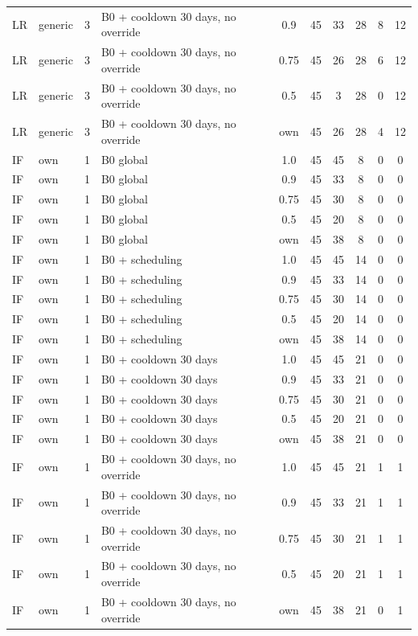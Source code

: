 \documentclass[10pt,onecolumn,letterpaper]{article}
\begin{document}
\begin{longtable}{lllp{4.4cm}cccccc}
LR & generic & 3 & B0 + cooldown 30 days, no override & 0.9 & 45 & 33 & 28 & 8 & 12 \\
LR & generic & 3 & B0 + cooldown 30 days, no override & 0.75 & 45 & 26 & 28 & 6 & 12 \\
LR & generic & 3 & B0 + cooldown 30 days, no override & 0.5 & 45 & 3 & 28 & 0 & 12 \\
LR & generic & 3 & B0 + cooldown 30 days, no override & own & 45 & 26 & 28 & 4 & 12 \\
IF & own & 1 & B0 global & 1.0 & 45 & 45 & 8 & 0 & 0 \\
IF & own & 1 & B0 global & 0.9 & 45 & 33 & 8 & 0 & 0 \\
IF & own & 1 & B0 global & 0.75 & 45 & 30 & 8 & 0 & 0 \\
IF & own & 1 & B0 global & 0.5 & 45 & 20 & 8 & 0 & 0 \\
IF & own & 1 & B0 global & own & 45 & 38 & 8 & 0 & 0 \\
IF & own & 1 & B0 + scheduling & 1.0 & 45 & 45 & 14 & 0 & 0 \\
IF & own & 1 & B0 + scheduling & 0.9 & 45 & 33 & 14 & 0 & 0 \\
IF & own & 1 & B0 + scheduling & 0.75 & 45 & 30 & 14 & 0 & 0 \\
IF & own & 1 & B0 + scheduling & 0.5 & 45 & 20 & 14 & 0 & 0 \\
IF & own & 1 & B0 + scheduling & own & 45 & 38 & 14 & 0 & 0 \\
IF & own & 1 & B0 + cooldown 30 days & 1.0 & 45 & 45 & 21 & 0 & 0 \\
IF & own & 1 & B0 + cooldown 30 days & 0.9 & 45 & 33 & 21 & 0 & 0 \\
IF & own & 1 & B0 + cooldown 30 days & 0.75 & 45 & 30 & 21 & 0 & 0 \\
IF & own & 1 & B0 + cooldown 30 days & 0.5 & 45 & 20 & 21 & 0 & 0 \\
IF & own & 1 & B0 + cooldown 30 days & own & 45 & 38 & 21 & 0 & 0 \\
IF & own & 1 & B0 + cooldown 30 days, no override & 1.0 & 45 & 45 & 21 & 1 & 1 \\
IF & own & 1 & B0 + cooldown 30 days, no override & 0.9 & 45 & 33 & 21 & 1 & 1 \\
IF & own & 1 & B0 + cooldown 30 days, no override & 0.75 & 45 & 30 & 21 & 1 & 1 \\
IF & own & 1 & B0 + cooldown 30 days, no override & 0.5 & 45 & 20 & 21 & 1 & 1 \\
IF & own & 1 & B0 + cooldown 30 days, no override & own & 45 & 38 & 21 & 0 & 1 \\

\end{longtable}
\end{document}

